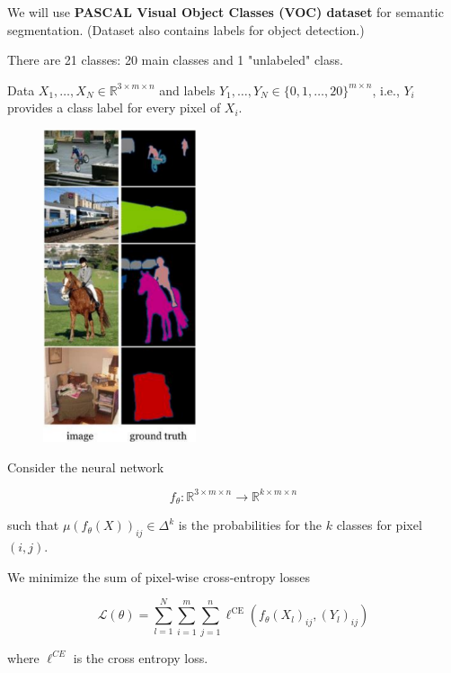 \begin{definition}
    We will use \textbf{PASCAL Visual Object Classes (VOC) dataset} for semantic segmentation.
    (Dataset also contains labels for object detection.)

    There are 21 classes: 20 main classes and 1 "unlabeled" class.

    Data $X_{1}, \ldots, X_{N} \in \mathbb{R}^{3 \times m \times n}$ and labels $Y_{1}, \ldots, Y_{N} \in\{0,1, \ldots, 20\}^{m \times n}$, i.e., $Y_{i}$ provides a class label for every pixel of $X_{i}$.

    \begin{figure}[H]
        \centering
        \includegraphics[width=0.4\textwidth]{.././assets/8.24.png}
    \end{figure}
\end{definition}

\begin{concept}
    Consider the neural network

    $$
    f_{\theta}: \mathbb{R}^{3 \times m \times n} \rightarrow \mathbb{R}^{k \times m \times n}
    $$

    such that $\mu\left(f_{\theta}(X)\right)_{i j} \in \Delta^{k}$ is the probabilities for the $k$ classes for pixel $(i, j)$.

    We minimize the sum of pixel-wise cross-entropy losses

    $$
    \mathcal{L}(\theta)=\sum_{l=1}^{N} \sum_{i=1}^{m} \sum_{j=1}^{n} \ell^{\mathrm{CE}}\left(f_{\theta}\left(X_{l}\right)_{i j},\left(Y_{l}\right)_{i j}\right)
    $$

    where $\ell^{C E}$ is the cross entropy loss.
\end{concept}

